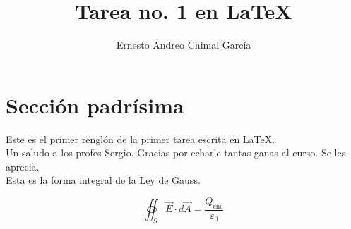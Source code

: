 \documentclass[a4paper,10pt]{article}
\begin{document}
\title{Tarea no. 1 en \LaTeX} 
\author{Ernesto Andreo Chimal García}

\maketitle


\section{Sección padrísima}

Este es el primer renglón de la primer tarea escrita en \LaTeX. \\ %

Un saludo a los profes Sergio. Gracias por echarle tantas ganas al curso. Se les aprecia.\\ %


Esta es la forma integral de la Ley de Gauss.

$$
\oiint_S \vec{E}\cdot d\vec{A}=\frac{Q_{\text{enc}}}{\varepsilon_0}
$$
\end{document}
